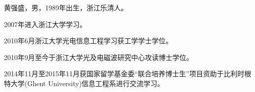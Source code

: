 \begin{resume}
黄强盛，男，1989年出生，浙江乐清人。

2007年进入浙江大学学习。

2010年6月浙江大学光电信息工程学习获工学学士学位。

2010年9月至今于浙江大学光及电磁波研究中心攻读博士学位。

2014年11月至2015年11月获国家留学基金委“联合培养博士生”项目资助于比利时根特大学(Ghent University)信息工程系进行交流学习。
\end{resume}
